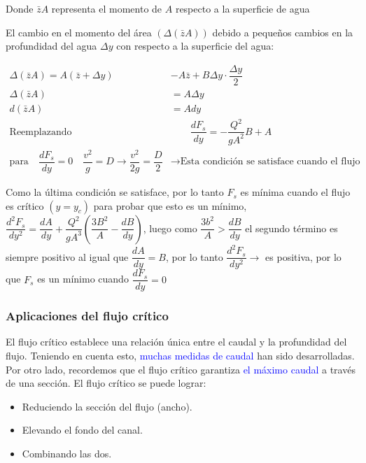 \documentclass[11pt, oneside]{article}
\begin{document}
Donde $\bar{z}A$ representa el momento de $A$ respecto a la superficie de agua

El cambio en el  momento del área $(\Delta(\bar{z}A))$ debido a pequeños cambios en la profundidad del agua $\Delta y$ con respecto a la superficie del agua:

\begin{equation}
    \begin{aligned}
        \Delta(\bar{z}A)=A(\bar{z}+\Delta y)&-A\bar{z}+B\Delta y \cdot \dfrac{\Delta y}{2}\\ 
        \Delta(\bar{z}A)&=A \Delta y\\
        d(\bar{z}A)&=Ady\\
        \text{Reemplazando}& \qquad \dfrac{dF_{s}}{dy}=-\dfrac{Q^{2}}{gA^{2}}B+A\\
        \text{para} \quad \dfrac{dF_{s}}{dy}=0 \quad \dfrac{v^{2}}{g}=D \rightarrow \dfrac{v^{2}}{2g}=\dfrac{D}{2} &\rightarrow \text{Esta condición se satisface cuando el flujo es crítico}
    \end{aligned} 
\end{equation}

Como la última condición se satisface, por lo tanto $F_{s}$ es mínima cuando el flujo es crítico $(y=y_c)$ para probar que esto es un mínimo, $\dfrac{d^{2}F_{s}}{dy^{2}}=\dfrac{dA}{dy}+\dfrac{Q^{2}}{gA^{3}}\left(\dfrac{3B^{2}}{A}-\dfrac{dB}{dy}\right)$, luego como $\dfrac{3b^{2}}{A}>\dfrac{dB}{dy}$ el segundo término es siempre positivo al igual que $\dfrac{dA}{dy}=B$, por lo tanto $\dfrac{d^{2}F_{s}}{dy^{2}}\rightarrow$ es positiva, por lo que $F_s$ es un mínimo cuando $\dfrac{dF_{s}}{dy}=0$

\subsubsection{Aplicaciones del flujo crítico}

El flujo crítico establece una relación única entre el caudal y la profundidad del flujo. Teniendo en cuenta esto, \textcolor{blue}{muchas medidas de caudal} han sido desarrolladas. Por otro lado, recordemos que el flujo crítico garantiza \textcolor{blue}{el máximo caudal} a través de una sección. El flujo crítico se puede lograr:

\begin{itemize}
    \item Reduciendo la sección del flujo (ancho).
    \item Elevando el fondo del canal.
    \item Combinando las dos.
\end{itemize}
\end{document}
